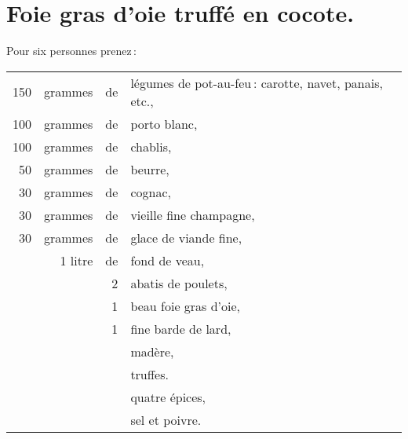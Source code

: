 \section*{\centering Foie gras d’oie truffé en cocote.}
{}

Pour six personnes prenez :

\medskip

\footnotesize
\begin{longtable}{rrrp{16em}}
    150 & grammes & de & légumes de pot-au-feu : carotte, navet, panais, etc.,                            \\
    100 & grammes & de & porto blanc,                                                                     \\
    100 & grammes & de & chablis,                                                                         \\
     50 & grammes & de & beurre,                                                                          \\
     30 & grammes & de & cognac,                                                                          \\
     30 & grammes & de & vieille fine champagne,                                                          \\
     30 & grammes & de & glace de viande fine,                                                            \\
        & 1 litre & de & fond de veau,                                                                    \\
        &         &  2 & abatis de poulets,                                                               \\
        &         &  1 & beau foie gras d'oie,                                                            \\
        &         &  1 & fine barde de lard,                                                              \\
        &         &    & madère,                                                                          \\
        &         &    & truffes.                                                                         \\
        &         &    & quatre épices,                                                                   \\
        &         &    & sel et poivre.                                                                   \\
\end{longtable}
\normalsize

